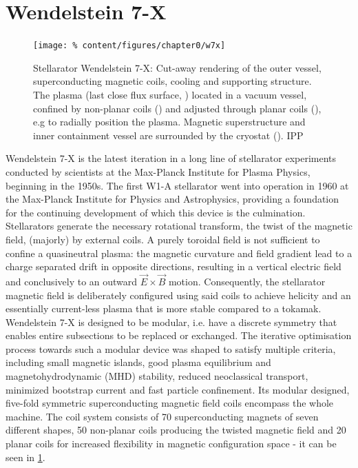     \section{Wendelstein 7-X}\label{sec:w7x}%
%
        \begin{figure}%
            \centering%
            \texttt{[image: \%
                content/figures/chapter0/w7x]}%
            \caption{Stellarator Wendelstein 7-X: Cut-away rendering of the outer vessel, superconducting magnetic coils, cooling and supporting structure. The plasma (last close flux surface, \color{pink}{pink}) located in a vacuum vessel, confined by non-planar coils (\color{grey}{grey}) and adjusted through planar coils (\color{orange}{orange}), e.g to radially position the plasma. Magnetic superstructure and inner containment vessel are surrounded by the cryostat (\color{grey}{grey}). \textcopyright IPP}\label{fig:w7x}%
        \end{figure}%
%
        Wendelstein 7-X is the latest iteration in a long line of stellarator experiments conducted by scientists at the Max-Planck Institute for Plasma Physics, beginning in the 1950s. The first W1-A stellarator went into operation in 1960 at the Max-Planck Institute for Physics and Astrophysics, providing a foundation for the continuing development of which this device is the culmination.\\%
        Stellarators generate the necessary rotational transform, the twist of the magnetic field, (majorly) by external coils. A purely toroidal field is not sufficient to confine a quasineutral plasma: the magnetic curvature and field gradient lead to a charge separated drift in opposite directions, resulting in a vertical electric field and conclusively to an outward $\vec{E}\times\vec{B}$ motion. Consequently, the stellarator magnetic field is deliberately configured using said coils to achieve helicity and an essentially current-less plasma that is more stable compared to a tokamak. Wendelstein 7-X is designed to be modular, i.e. have a discrete symmetry that enables entire subsections to be replaced or exchanged. The iterative optimisation process towards such a modular device was shaped to satisfy multiple criteria, including small magnetic islands, good plasma equilibrium and magnetohydrodynamic (MHD) stability, reduced neoclassical transport, minimized bootstrap current and fast particle confinement. Its modular designed, five-fold symmetric superconducting magnetic field coils encompass the whole machine. The coil system consists of 70 superconducting magnets of seven different shapes, 50 non-planar coils producing the twisted magnetic field and 20 planar coils for increased flexibility in magnetic configuration space - it can be seen in \cref{fig:w7x}\cite{Spitzer1958,Boozer1998,Wagner1998,Beidler1990}.\\%
